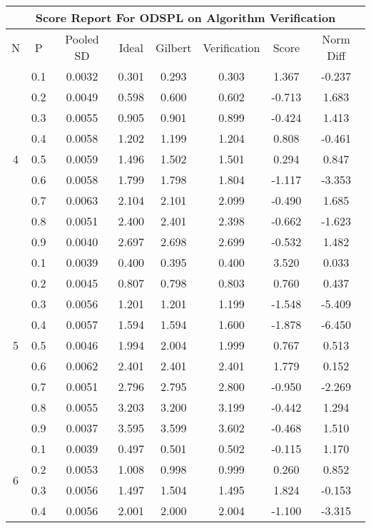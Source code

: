 \documentclass[11pt,a4paper]{report}
\begin{document}
\begin{longtable}{ | c | c || c | c | c | c | c | c | }
\hline
\multicolumn{8}{|c|}{ Score Report For ODSPL on Algorithm Verification} \\
\hline
N & P & Pooled SD &  Ideal &  Gilbert & Verification  & Score & Norm Diff \\
 \hline
 \hline
 \endhead
\multirow{9}{*}{4} & 0.1 & 0.0032 & 0.301 & 0.293 & 0.303 & 1.367 & -0.237 \\
 & 0.2 & 0.0049 & 0.598 & 0.600 & 0.602 & -0.713 & 1.683 \\
 & 0.3 & 0.0055 & 0.905 & 0.901 & 0.899 & -0.424 & 1.413 \\
 & 0.4 & 0.0058 & 1.202 & 1.199 & 1.204 & 0.808 & -0.461 \\
 & 0.5 & 0.0059 & 1.496 & 1.502 & 1.501 & 0.294 & 0.847 \\
 & 0.6 & 0.0058 & 1.799 & 1.798 & 1.804 & -1.117 & -3.353 \\
 & 0.7 & 0.0063 & 2.104 & 2.101 & 2.099 & -0.490 & 1.685 \\
 & 0.8 & 0.0051 & 2.400 & 2.401 & 2.398 & -0.662 & -1.623 \\
 & 0.9 & 0.0040 & 2.697 & 2.698 & 2.699 & -0.532 & 1.482 \\
 \hline
\multirow{9}{*}{5} & 0.1 & 0.0039 & 0.400 & 0.395 & 0.400 & 3.520 & 0.033 \\
 & 0.2 & 0.0045 & 0.807 & 0.798 & 0.803 & 0.760 & 0.437 \\
 & 0.3 & 0.0056 & 1.201 & 1.201 & 1.199 & -1.548 & -5.409 \\
 & 0.4 & 0.0057 & 1.594 & 1.594 & 1.600 & -1.878 & -6.450 \\
 & 0.5 & 0.0046 & 1.994 & 2.004 & 1.999 & 0.767 & 0.513 \\
 & 0.6 & 0.0062 & 2.401 & 2.401 & 2.401 & 1.779 & 0.152 \\
 & 0.7 & 0.0051 & 2.796 & 2.795 & 2.800 & -0.950 & -2.269 \\
 & 0.8 & 0.0055 & 3.203 & 3.200 & 3.199 & -0.442 & 1.294 \\
 & 0.9 & 0.0037 & 3.595 & 3.599 & 3.602 & -0.468 & 1.510 \\
 \hline
\multirow{9}{*}{6} & 0.1 & 0.0039 & 0.497 & 0.501 & 0.502 & -0.115 & 1.170 \\
 & 0.2 & 0.0053 & 1.008 & 0.998 & 0.999 & 0.260 & 0.852 \\
 & 0.3 & 0.0056 & 1.497 & 1.504 & 1.495 & 1.824 & -0.153 \\
 & 0.4 & 0.0056 & 2.001 & 2.000 & 2.004 & -1.100 & -3.315 \\

\end{longtable}
\end{document}
